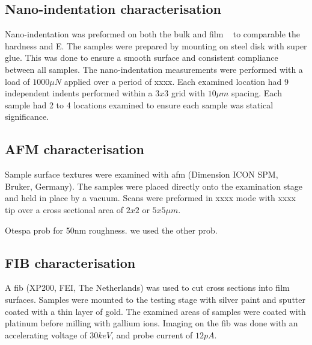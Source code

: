 \documentclass[a4paper,12pt,oneside]{report}%
\begin{document}
\subsection{Nano-indentation characterisation}
Nano-indentation was preformed on both the bulk and film \MgZnCa~ to comparable the hardness and \gls{E}. The samples were prepared by mounting on steel disk with super glue. This was done to ensure a smooth surface and consistent compliance between all samples. The nano-indentation measurements were performed with a load of $1000 \mu N$ applied over a period of xxxx. Each examined location had 9 independent indents performed within a $3 x 3$ grid with $10 \mu m$ spacing. Each sample had 2 to 4 locations examined to ensure each sample was statical significance. 

\subsection{AFM characterisation}
Sample surface textures were examined with \gls{afm} (Dimension ICON SPM, Bruker, Germany). The samples were placed directly onto the examination stage and held in place by a vacuum. Scans were preformed in xxxx mode with xxxx tip over a cross sectional area of $2x2$ or $5x5 \mu m$. 

Otespa prob for 50nm roughness. we used the other prob. 

\subsection{FIB characterisation}
A \gls{fib} (XP200, FEI, The Netherlands) was used to cut cross sections into film surfaces. Samples were mounted to the testing stage with silver paint and sputter coated with a thin layer of gold. The examined areas of samples were coated with platinum before milling with gallium ions. Imaging on the \gls{fib} was done with an accelerating voltage of $30keV$, and probe current of $12 pA$.




\end{document}
